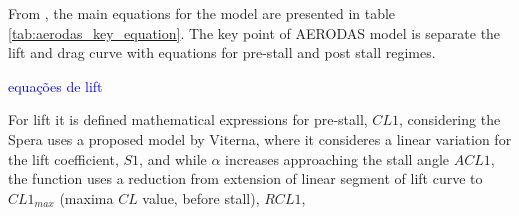 From \cite{spera_models_2008}, the main equations for the model are presented in table \ref{tab:aerodas_key_equation}. The key point of AERODAS model is separate the lift and drag curve with equations for pre-stall and post stall regimes. 

\textcolor{blue}{equações de lift}

For lift it is defined mathematical expressions for pre-stall, $CL1$, considering the Spera \cite{spera_models_2008} uses a proposed model by Viterna, where it consideres a linear variation for the lift coefficient, $S1$, and while $\alpha$ increases approaching the stall angle $ACL1$, the function uses a reduction from extension of linear segment of lift curve to $CL1_{max}$ (maxima $CL$ value, before stall), $RCL1$, 

